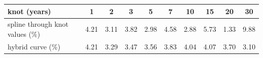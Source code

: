 \begin{tabular}{lccccccccc}
\toprule
knot (years) & 1 & 2 & 3 & 5 & 7 & 10 & 15 & 20 & 30 \\
\midrule
spline through knot values (\%) & 4.21 & 3.11 & 3.82 & 2.98 & 4.58 & 2.88 & 5.73 & 1.33 & 9.88 \\
hybrid curve (\%) & 4.21 & 3.29 & 3.47 & 3.56 & 3.83 & 4.04 & 4.07 & 3.70 & 3.10 \\
\bottomrule
\end{tabular}